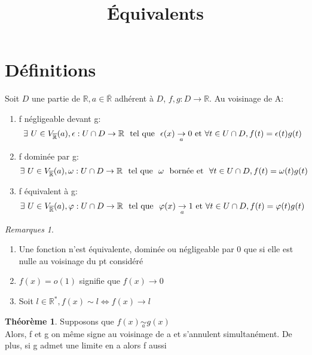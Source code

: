 \documentclass[fleqn]{article}
\title{\'Equivalents}
\date{}
\theoremstyle{definition} \newtheorem*{defi}{D\'efinition}
\theoremstyle{definition} \newtheorem*{theo}{Th\'eor\`eme}
\theoremstyle{remark} \newtheorem*{rqs}{Remarques}
\begin{document}
\maketitle

\section{D\'efinitions}
Soit $D$ une partie de $\mathbb{R}, a \in \overline{\mathbb{R}}$ adh\'erent \`a $D$, $f,g: D \rightarrow \mathbb{R}$. Au voisinage de A:
\begin{enumerate}
	\item f n\'egligeable devant g:
		\[\exists\ U \in V_{\overline{\mathbb{R}}%
		}(a), \epsilon: U \cap D \rightarrow \mathbb{R}$ \text{ tel que }
		$\epsilon(x)\underset{a}{\rightarrow}  0$ et $\forall t \in U \cap D, f(t)=\epsilon(t)g(t)\]
	\item f domin\'ee par g:
		\[\exists\ U \in V_{\overline{\mathbb{R}}%
		}(a), \omega: U \cap D \rightarrow \mathbb{R}$ \text{ tel que } $\omega$ \text{ born\'ee et }
		$\forall t \in U \cap D, f(t)=\omega(t)g(t)\]
	\item f \'equivalent \`a g:
		\[\exists\ U \in V_{\overline{\mathbb{R}}%
		}(a), \varphi: U \cap D \rightarrow \mathbb{R}$ \text{ tel que }
		$\varphi(x)\underset{a}{\rightarrow} 1$ et $\forall t \in U \cap D, f(t)=\varphi(t)g(t)\]
\end{enumerate}

\begin{rqs} $ $
	\begin{enumerate}
		\item Une fonction n'est \'equivalente, domin\'ee ou n\'egligeable par 0 que si elle est nulle au voisinage du pt consid\'er\'e
		\item $f(x) = o(1)$ signifie que $f(x) \rightarrow 0$
		\item Soit $l \in \mathbb{R}^{*}, f(x) \sim l \Leftrightarrow f(x) \rightarrow l$
	\end{enumerate}
\end{rqs}

\begin{theo}
	Supposons que $f(x)\underset{a}{\sim} g(x)$\\
	Alors, f et g on m\^eme signe au voisinage de a et s'annulent simultan\'ement. De plus, si g admet une limite en a alors f aussi
\end{theo}

\end{document}
